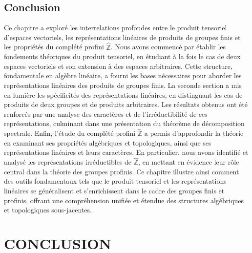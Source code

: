 \documentclass[a4paper, 14pt]{report}
\newcommand{\applyfontsize}{%
	\fontsize{12}{12}\selectfont
}
\begin{document}
\begin{onehalfspace}
{			\section*{Conclusion}
			Ce chapitre a exploré les interrelations profondes entre le produit tensoriel d'espaces vectoriels, les représentations linéaires de produits de groupes finis et les propriétés du complété profini $\widehat{\mathbb{Z}}$.
			Nous avons commencé par établir les fondements théoriques du produit tensoriel, en étudiant à la fois le cas de deux espaces vectoriels et son extension à des espaces arbitraires. Cette structure, fondamentale en algèbre linéaire, a fourni les bases nécessaires pour aborder les représentations linéaires des produits de groupes finis.
			La seconde section a mis en lumière les spécificités des représentations linéaires, en distinguant les cas de produits de deux groupes et de produits arbitraires. Les résultats obtenus ont été renforcés par une analyse des caractères et de l'irréductibilité de ces représentations, culminant dans une présentation du théorème de décomposition spectrale.
			Enfin, l'étude du complété profini $\widehat{\mathbb{Z}}$ a permis d'approfondir la théorie en examinant ses propriétés algébriques et topologiques, ainsi que ses représentations linéaires et leurs caractères. En particulier, nous avons identifié et analysé les représentations irréductibles de $\widehat{\mathbb{Z}}$, en mettant en évidence leur rôle central dans la théorie des groupes profinis.
			Ce chapitre illustre ainsi comment des outils fondamentaux tels que le produit tensoriel et les représentations linéaires se généralisent et s'enrichissent dans le cadre des groupes finis et profinis, offrant une compréhension unifiée et étendue des structures algébriques et topologiques sous-jacentes.
			
			
			\chapter*{CONCLUSION}
			{
				\applyfontsize %
				
}}
\end{onehalfspace}
\end{document}
